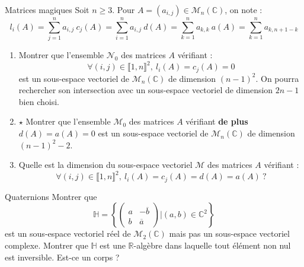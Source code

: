 \documentclass[french,a4paper]{article}
\newcommand{\R}{\mathbb{R}}
\newcommand{\C}{\mathbb{C}}
\theoremstyle{plain}
\theoremstyle{definition}
\theoremstyle{remark}
\begin{document}
\begin{ex}{Matrices magiques}
	Soit $n\geqslant 3$. Pour $A=(a_{i,j})\in\mathcal{M}_n(\C)$, on note : $$l_i(A)=\sum_{j=1}^{n}a_{i,j}\ c_j(A)=\sum_{i=1}^{n}a_{i,j}\ d(A)=\sum_{k=1}^{n}a_{k,k}\ a(A)=\sum_{k=1}^{n}a_{k,n+1-k}$$
	\begin{enumerate}
		\item Montrer que l'ensemble $\mathcal{N}_0$ des matrices $A$ vérifiant : $$\forall (i,j)\in\llbracket1,n\rrbracket^2,\ l_i(A)=c_j(A)=0$$ est un sous-espace vectoriel de $\mathcal{M}_n(\C)$ de dimension $(n-1)^2$. On pourra rechercher son intersection avec un sous-espace vectoriel de dimension $2n-1$ bien choisi.
		\item $\star$ Montrer que l'ensemble $\mathcal{M}_0$ des matrices $A$ vérifiant \textbf{de plus} $d(A)=a(A)=0$ est un sous-espace vectoriel de $\mathcal{M}_n(\C)$ de dimension $(n-1)^2-2$.
		\item Quelle est la dimension du sous-espace vectoriel $\mathcal{M}$ des matrices $A$ vérifiant : $$\forall (i,j)\in\llbracket1,n\rrbracket^2,\ l_i(A)=c_j(A)=d(A)=a(A)\ ?$$
	\end{enumerate}
\end{ex}

\begin{ex}{Quaternions}
	Montrer que $$\mathbb{H}=\left\{\begin{pmatrix}
		a&-\overline{b}\\
		b&\overline{a}
	\end{pmatrix}\bigg| (a,b)\in\C^2\right\}$$ est un sous-espace vectoriel réel de $\mathcal{M}_2(\C)$ mais pas un sous-espace vectoriel complexe. Montrer que $\mathbb{H}$ est une $\R$-algèbre dans laquelle tout élément non nul est inversible. Est-ce un corps ?
\end{ex}
\end{document}
